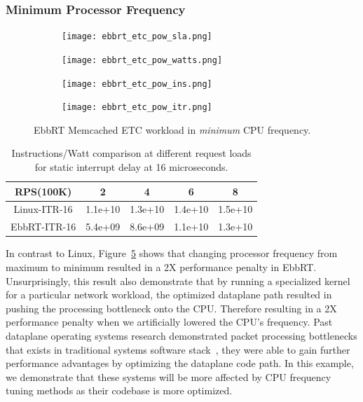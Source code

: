 \documentclass[letterpaper,twocolumn,10pt]{article}
\begin{document}
\subsubsection{Minimum Processor Frequency}
\begin{figure}
  \begin{subfigure}[b]{0.5\textwidth}
    \texttt{[image: ebbrt\_etc\_pow\_sla.png]}
    \caption{}
    \label{fig:ebbrt_etc_pow:sla}
  \end{subfigure}
  \begin{subfigure}[b]{0.5\textwidth}
    \texttt{[image: ebbrt\_etc\_pow\_watts.png]}
    \caption{}
    \label{fig:ebbrt_etc_pow:watts}
  \end{subfigure}
    \begin{subfigure}[b]{0.5\textwidth}
    \texttt{[image: ebbrt\_etc\_pow\_ins.png]}
    \label{fig:ebbrt_etc_pow:ins}
  \end{subfigure}
  \begin{subfigure}[b]{0.5\textwidth}
    \texttt{[image: ebbrt\_etc\_pow\_itr.png]}
    \label{fig:ebbrt_etc_pow:itrs}
  \end{subfigure}
  \caption{EbbRT Memcached ETC workload in \textit{minimum} CPU frequency.}
  \label{fig:ebbrt_etc_pow:main}
\end{figure}

\begin{table}[h!]
\centering
\begin{tabular}{ |c|c|c|c|c| } 
 \hline
 RPS(100K) & 2 & 4 & 6 & 8 \\
 \hline
 Linux-ITR-16 & 1.1e+10 & 1.3e+10 & 1.4e+10 & 1.5e+10 \\
 EbbRT-ITR-16 & 5.4e+09 & 8.6e+09 & 1.1e+10 & 1.3e+10 \\
 \hline
\end{tabular}
\caption{Instructions/Watt comparison at different request loads for static interrupt delay at 16 microseconds.}
\label{tab:ins_per_watt2}
\end{table}

In contrast to Linux, Figure~\ref{fig:ebbrt_etc_pow:main} shows that changing processor frequency from maximum to minimum resulted in a 2X performance penalty in EbbRT. Unsurprisingly, this result also demonstrate that by running a specialized kernel for a particular network workload, the optimized dataplane path resulted in pushing the processing bottleneck onto the CPU. Therefore resulting in a 2X performance penalty when we artificially lowered the CPU's frequency. Past dataplane operating systems research demonstrated packet processing bottlenecks that exists in traditional systems software stack~\cite{ix, arrakis, ebbrt}, they were able to gain further performance advantages by optimizing the dataplane code path. In this example, we demonstrate that these systems will be more affected by CPU frequency tuning methods as their codebase is more optimized.
\end{document}
